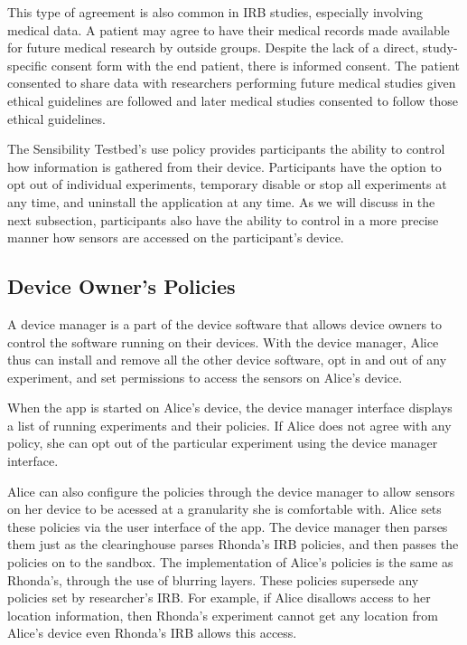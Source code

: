 This type of agreement is also common in IRB studies, especially involving
medical data.  A patient may agree to have their medical records made 
available for future medical research by outside groups.  Despite the lack
of a direct, study-specific consent form with the end patient, there is
informed consent.  The patient consented to share data with researchers
performing future medical studies given ethical guidelines are followed 
and later medical studies consented to follow those ethical guidelines.

The Sensibility Testbed's use policy provides participants the ability
to control how information is gathered from their device. Participants
have the option to opt out of individual experiments, temporary
disable or stop all experiments at any time, and uninstall the 
application at any time.  As we will discuss in the next subsection,
participants also have the ability to control in a more precise manner
how sensors are accessed on the participant's device.



\subsection{Device Owner's Policies}\label{sec-alice-policy}
A device manager is a part of the device software that 
allows device owners to control the software running on their 
devices. With the device manager, Alice thus can install and remove 
all the other device software, opt in and out of any experiment, 
and set permissions to access the sensors on Alice's device. 

When the \sysname app is started on Alice's device, the device 
manager interface displays a list of running experiments and their policies. If 
Alice does not agree with any policy, she can opt out of the particular 
experiment using the device manager interface. 

Alice can also configure the policies through the device manager to allow
sensors on her device to be acessed at a granularity she is comfortable with.
Alice sets these policies via the user interface of the \sysname app. 
The device manager then parses them just as the clearinghouse
parses Rhonda's IRB policies, and then passes the policies on to the sandbox.
The implementation of Alice's policies is the same as Rhonda's, through
the use of blurring layers.
These policies supersede any policies set by researcher's IRB. For 
example, if Alice disallows access to her location information, then 
Rhonda's experiment cannot get any location from Alice's device even
Rhonda's IRB allows this access. 


